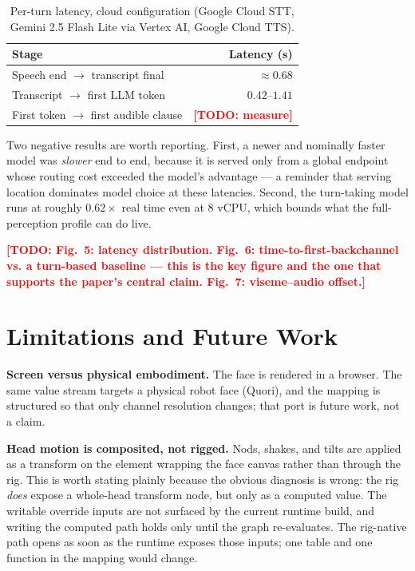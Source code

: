 \documentclass[conference]{IEEEtran}
\newcommand{\todo}[1]{\textcolor{red}{\textbf{[TODO: #1]}}}
\begin{document}
\begin{table}[h]
  \centering
  \caption{Per-turn latency, cloud configuration (Google Cloud STT,
  Gemini 2.5 Flash Lite via Vertex AI, Google Cloud TTS).}
  \label{tab:latency}
  \begin{tabular}{lr}
    \toprule
    Stage & Latency (s) \\
    \midrule
    Speech end $\rightarrow$ transcript final & $\approx 0.68$ \\
    Transcript $\rightarrow$ first LLM token  & $0.42$--$1.41$ \\
    First token $\rightarrow$ first audible clause & \todo{measure} \\
    \bottomrule
  \end{tabular}
\end{table}

Two negative results are worth reporting. First, a newer and nominally faster
model was \emph{slower} end to end, because it is served only from a global
endpoint whose routing cost exceeded the model's advantage --- a reminder that
serving location dominates model choice at these latencies. Second, the
turn-taking model runs at roughly $0.62\times$ real time even at 8 vCPU, which
bounds what the full-perception profile can do live.

\todo{Fig.~5: latency distribution. Fig.~6: time-to-first-backchannel vs. a
turn-based baseline --- this is the key figure and the one that supports the
paper's central claim. Fig.~7: viseme--audio offset.}

\section{Limitations and Future Work}
\label{sec:limits}

\textbf{Screen versus physical embodiment.} The face is rendered in a browser.
The same value stream targets a physical robot face (Quori), and the mapping is
structured so that only channel resolution changes; that port is future work,
not a claim.

\textbf{Head motion is composited, not rigged.} Nods, shakes, and tilts are
applied as a transform on the element wrapping the face canvas rather than
through the rig. This is worth stating plainly because the obvious diagnosis is
wrong: the rig \emph{does} expose a whole-head transform node, but only as a
computed value. The writable override inputs are not surfaced by the current
runtime build, and writing the computed path holds only until the graph
re-evaluates. The rig-native path opens as soon as the runtime exposes those
inputs; one table and one function in the mapping would change.
\end{document}
